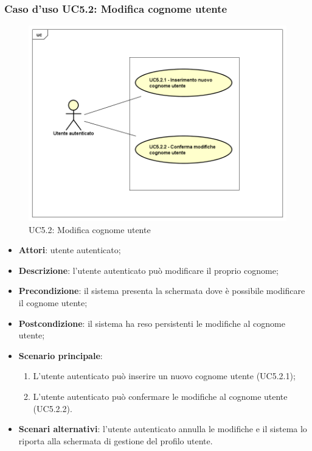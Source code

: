 \subsubsection{Caso d'uso UC5.2: Modifica cognome utente}
\label{UC5.2}
\begin{figure}[h]
	\centering
	\includegraphics[scale=0.5,keepaspectratio]{UML/UC5_2.png}
	\caption{UC5.2: Modifica cognome utente}
\end{figure}
\begin{itemize}
	\item \textbf{Attori}: utente autenticato;
	\item \textbf{Descrizione}: l'utente autenticato può modificare il proprio cognome;
	\item \textbf{Precondizione}: il sistema presenta la schermata dove è possibile modificare il cognome utente;
	\item \textbf{Postcondizione}: il sistema ha reso persistenti le modifiche al cognome utente;
	\item \textbf{Scenario principale}:
	\begin{enumerate}
		\item L'utente autenticato può inserire un nuovo cognome utente (UC5.2.1);
		\item L'utente autenticato può confermare le modifiche al cognome utente (UC5.2.2).
	\end{enumerate}
	\item \textbf{Scenari alternativi}: l'utente autenticato annulla le modifiche e il sistema lo riporta alla schermata di gestione del profilo utente.
\end{itemize}

